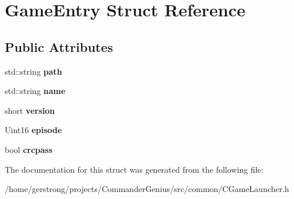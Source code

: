 \hypertarget{struct_game_entry}{
\section{GameEntry Struct Reference}
\label{struct_game_entry}
}
\subsection*{Public Attributes}
\begin{DoxyCompactItemize}
\item 
\hypertarget{struct_game_entry_ab367d87f661207fc9237e5f527a541b5}{
std::string {\bfseries path}}
\label{struct_game_entry_ab367d87f661207fc9237e5f527a541b5}

\item 
\hypertarget{struct_game_entry_ae56d94ee4a566b483154db6884ddbf8a}{
std::string {\bfseries name}}
\label{struct_game_entry_ae56d94ee4a566b483154db6884ddbf8a}

\item 
\hypertarget{struct_game_entry_a978a08fb762ce18d564af1279428d2e8}{
short {\bfseries version}}
\label{struct_game_entry_a978a08fb762ce18d564af1279428d2e8}

\item 
\hypertarget{struct_game_entry_a9cc0a478448a11718cb1b2b60bf5ce41}{
Uint16 {\bfseries episode}}
\label{struct_game_entry_a9cc0a478448a11718cb1b2b60bf5ce41}

\item 
\hypertarget{struct_game_entry_a2945dc7fade5de328255377f63b58a81}{
bool {\bfseries crcpass}}
\label{struct_game_entry_a2945dc7fade5de328255377f63b58a81}

\end{DoxyCompactItemize}


The documentation for this struct was generated from the following file:\begin{DoxyCompactItemize}
\item 
/home/gerstrong/projects/CommanderGenius/src/common/CGameLauncher.h\end{DoxyCompactItemize}
